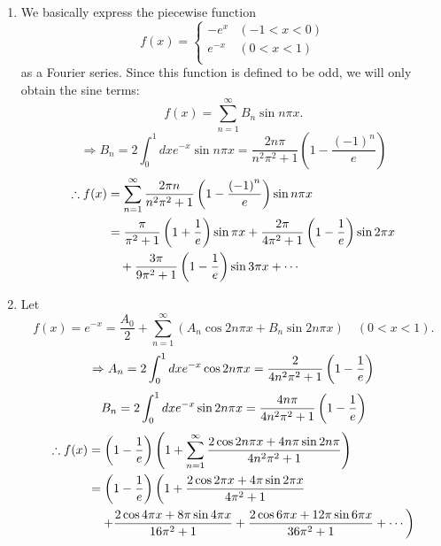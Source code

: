 \item

\begin{enumerate}[wide, labelindent = 0pt, label = (\alph*)]
\item
We basically express the piecewise function
\[
    f(x) = \begin{cases}
        -e^{x} & (-1 < x < 0) \\
        e^{-x} & ( 0 < x < 1) \\
    \end{cases}
\]
as a Fourier series.
Since this function is defined to be odd, we will only obtain the sine terms:
\[
    f(x) = \sum_{n=1}^\infty B_n \sin n\pi x.
\]
\[
    \Rightarrow B_n
    = 2\int_0^1 dx e^{-x} \sin n\pi x 
    = \frac{2n\pi}{n^2 \pi^2 + 1} \left( 1 - \frac{{(-1)}^n}{e} \right)
\]
\begin{align*}
    \therefore f(x)
    &= \sum_{n=1}^\infty \frac{2\pi n}{n^2 \pi^2 + 1} \left( 1 - \frac{{(-1)}^n}{e} \right) \sin n\pi x \\
    &= \frac{ \pi}{ \pi^2 + 1} \left( 1 + \frac{1}{e} \right) \sin  \pi x
     + \frac{2\pi}{4\pi^2 + 1} \left( 1 - \frac{1}{e} \right) \sin 2\pi x \\
    &\quad + \frac{3\pi}{9\pi^2 + 1} \left( 1 - \frac{1}{e} \right) \sin 3\pi x
     + \cdots
\end{align*}

\item
Let
\[
    f(x)
    = e^{-x}
    = \frac{A_0}{2} + \sum_{n=1}^\infty \left( A_n \cos 2n\pi x + B_n \sin 2n\pi x \right)
    \quad (0 < x < 1).
\]
\[
    \Rightarrow A_n
    = 2 \int_0^1 dx e^{-x} \cos 2n\pi x
    = \frac{2}{4n^2 \pi^2 + 1} \left( 1 - \frac{1}{e} \right)
\]
\[
    B_n
    = 2 \int_0^1 dx e^{-x} \sin 2n\pi x
    = \frac{4n\pi}{4n^2 \pi^2 + 1} \left( 1 - \frac{1}{e} \right)
\]
\begin{align*}
    \therefore f(x)
    &= \left( 1 - \frac{1}{e} \right) \left(
        1 + \sum_{n=1}^\infty \frac{2\cos 2n\pi x + 4n\pi\sin 2n\pi}{4n^2 \pi^2 + 1}
    \right) \\
    &= \left( 1 - \frac{1}{e} \right) \left(
        1
        + \frac{2\cos 2\pi x + 4\pi\sin 2\pi x}{4\pi^2 + 1} \right. \\
    &\quad\left. + \frac{2\cos 4\pi x + 8\pi\sin 4\pi x}{16\pi^2 + 1}
        + \frac{2\cos 6\pi x + 12\pi\sin 6\pi x}{36\pi^2 + 1}
        + \cdots
    \right)
\end{align*}

\end{enumerate}